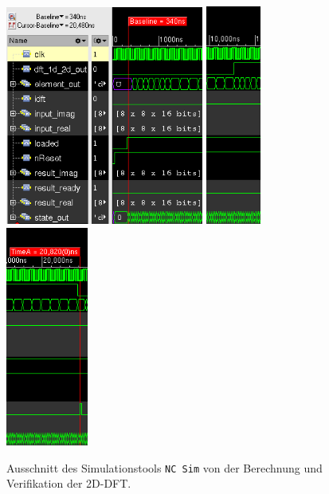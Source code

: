  
 \begin{figure}[htbp]
  \centering
  \includegraphics[width=0.58\textwidth]{img/Simulationsdauer_Anfang.png}
  \hfill
  \includegraphics[width=0.161\textwidth]{img/Simulationsdauer_Mitte.png}
  \hfill
  \includegraphics[width=0.241\textwidth]{img/Simulationsdauer_Ende.png}
  \caption{Ausschnitt des Simulationstools \texttt{NC\,Sim} von der Berechnung und Verifikation der 2D-DFT.}
  \label{pic:Simulationsdauer}
 \end{figure}

